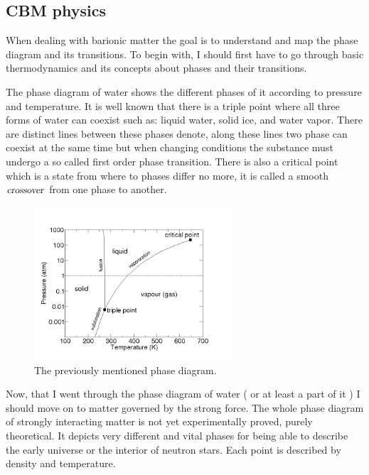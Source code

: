 \documentclass[a4paper,12pt]{article}
\begin{document}
\subsection{ CBM physics }
\vspace{3mm}
\par When dealing with barionic matter the goal is to understand and map the phase diagram and its transitions. To begin with, I should first have to go through basic thermodynamics and its concepts about phases and their transitions.
\vspace{3mm}
\par The phase diagram of water shows the different phases of it according to pressure and temperature. It is well known that there is a triple point where all three forms of water can coexist such as: liquid water,  solid ice, and water vapor. There are distinct lines between these phases denote, along these lines two phase can coexist at the same time but when changing conditions  the substance must undergo a so called first order phase transition. There is also a critical point which is a state from where to phases differ no more, it is called a smooth $\textsl{crossover}$ from one phase to another.
\begin{figure}[H]
\centering
\includegraphics[width=0.66\textwidth]{water_phase.jpg}
\caption{ The previously mentioned phase diagram. }
\end{figure}
\par Now, that I went through the phase diagram of water ( or at least a part of it ) I should move on to matter governed by the strong force. The whole phase diagram of strongly interacting matter is not yet experimentally proved, purely theoretical. It depicts very different and vital phases for being able to describe the early universe or the interior of neutron stars. Each point is described by density and temperature.
\end{document}
